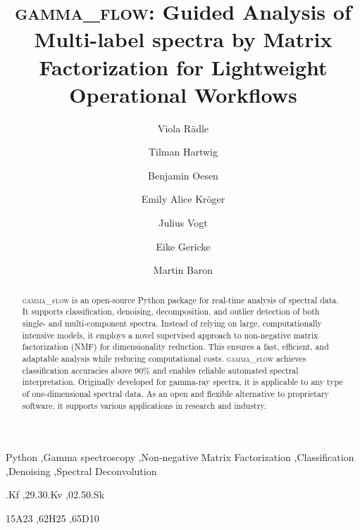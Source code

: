 \documentclass[preprint, 12pt, a4paper]{elsarticle}
\begin{document}
\renewcommand{\labelenumii}{\arabic{enumi}.\arabic{enumii}}

\begin{frontmatter}

\title{\textbf{\textsc{gamma\_flow}}: \textbf{G}uided \textbf{A}nalysis of \textbf{M}ulti-label spectra by \textbf{Ma}trix \textbf{F}actorization for \textbf{L}ightweight \textbf{O}perational \textbf{W}orkflows}

\author[ki-lab]{Viola Rädle }
\author[ki-lab]{Tilman Hartwig}
\author[ki-lab]{Benjamin Oesen}
\author[bfs]{Emily Alice Kröger}
\author[bfs]{Julius Vogt}
\author[bfs]{Eike Gericke}
\author[bfs]{Martin Baron}

\address[ki-lab]{Application Lab for AI and Big Data, German Environmental Agency, Leipzig, Germany}
\address[bfs]{Federal Office for Radiation Protection, Berlin, Germany}



\begin{abstract}
\textsc{gamma\_flow} is an open-source Python package for real-time analysis of spectral data. It supports classification, denoising, decomposition, and outlier detection of both single- and multi-component spectra. Instead of relying on large, computationally intensive models, it employs a novel supervised approach to non-negative matrix factorization (NMF) for dimensionality reduction. This ensures a fast, efficient, and adaptable analysis while reducing computational costs. \textsc{gamma\_flow} achieves classification accuracies above 90\% and enables reliable automated spectral interpretation. Originally developed for gamma-ray spectra, it is applicable to any type of one-dimensional spectral data. As an open and flexible alternative to proprietary software, it supports various applications in research and industry.
\end{abstract}

\begin{keyword}
Python \sep Gamma spectroscopy \sep Non-negative Matrix Factorization \sep Classification \sep Denoising \sep Spectral Deconvolution

.Kf %
\sep 29.30.Kv %
\sep 02.50.Sk %

\MSC[2020] 15A23 %
\sep 62H25 %
\sep 65D10 %

\end{keyword}

\end{frontmatter}
\end{document}
